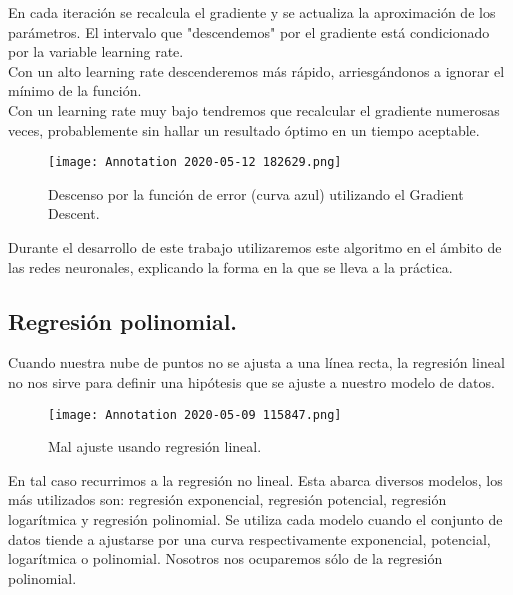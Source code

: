 \documentclass[a4paper,11pt]{article}
\begin{document}
\noindent
En cada iteración se recalcula el gradiente y se actualiza la aproximación de
los parámetros.
El intervalo que "descendemos" \hspace{0.16cm}por el gradiente está condicionado por la variable learning rate. \\

\noindent
Con un alto learning rate descenderemos más rápido, arriesgándonos a ignorar el mínimo de la función.\\ 

\noindent
Con un learning rate muy bajo tendremos que recalcular el gradiente numerosas veces, probablemente sin hallar un resultado óptimo en un tiempo aceptable.
\begin{figure}[H]
\centering
\texttt{[image: Annotation 2020-05-12 182629.png]}
\caption{Descenso por la función de error (curva azul) utilizando el Gradient Descent.}
\end{figure}
\noindent
Durante el desarrollo de este trabajo utilizaremos este algoritmo en el ámbito de las redes neuronales, explicando la forma en la que se lleva a la práctica.

\subsection{Regresión polinomial.}

Cuando nuestra nube de puntos no se ajusta a una línea recta, la regresión lineal no nos sirve para definir una hipótesis que se ajuste a nuestro modelo de datos.
\begin{figure}[H]
\centering
\texttt{[image: Annotation 2020-05-09 115847.png]}
\caption{Mal ajuste usando regresión lineal.}
\end{figure}
\noindent
En tal caso recurrimos a la regresión no lineal. Esta abarca diversos modelos, los más utilizados son: regresión exponencial, regresión potencial, regresión logarítmica y regresión polinomial. Se utiliza cada modelo cuando el conjunto de
datos tiende a ajustarse por una curva respectivamente exponencial, potencial,
logarítmica o polinomial. Nosotros nos ocuparemos sólo de la regresión polinomial.\\
\end{document}
